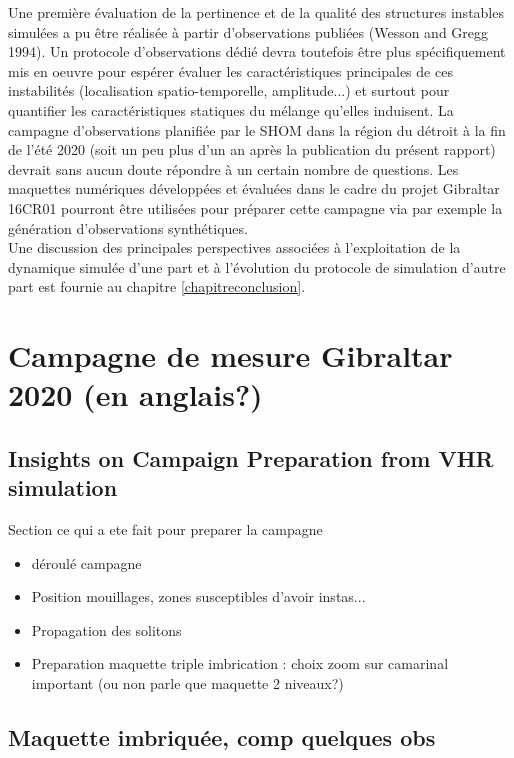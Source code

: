 Une première évaluation de la pertinence et de la qualité des structures instables simulées a pu être réalisée à partir d'observations publiées (Wesson and Gregg 1994). Un protocole d'observations dédié devra toutefois être plus spécifiquement mis en oeuvre pour espérer évaluer les caractéristiques principales de ces instabilités (localisation spatio-temporelle, amplitude...) et surtout pour quantifier les caractéristiques statiques du mélange qu'elles induisent. La campagne d'observations planifiée par le SHOM dans la région du détroit à la fin de l'été 2020 (soit un peu plus d'un an après la publication du présent rapport) devrait sans aucun doute répondre à un certain nombre de questions. Les maquettes numériques développées et évaluées dans le cadre du projet Gibraltar 16CR01 pourront être utilisées pour préparer cette campagne via par exemple la génération d'observations synthétiques.\\
Une discussion des principales perspectives associées à l'exploitation de la dynamique simulée d'une part et à l'évolution du protocole de simulation d'autre part est fournie au chapitre \ref{chapitreconclusion}.
\section{Campagne de mesure Gibraltar 2020 (en anglais?)}
\subsection{Insights on Campaign Preparation from VHR simulation}
Section ce qui a ete fait pour preparer la campagne

\begin{itemize}
\item déroulé campagne
\item Position mouillages, zones susceptibles d'avoir instas...
\item Propagation des solitons
\item Preparation maquette triple imbrication : choix zoom sur camarinal important (ou non parle que maquette 2 niveaux?)
\end{itemize}


\subsection{Maquette imbriquée, comp quelques obs}




